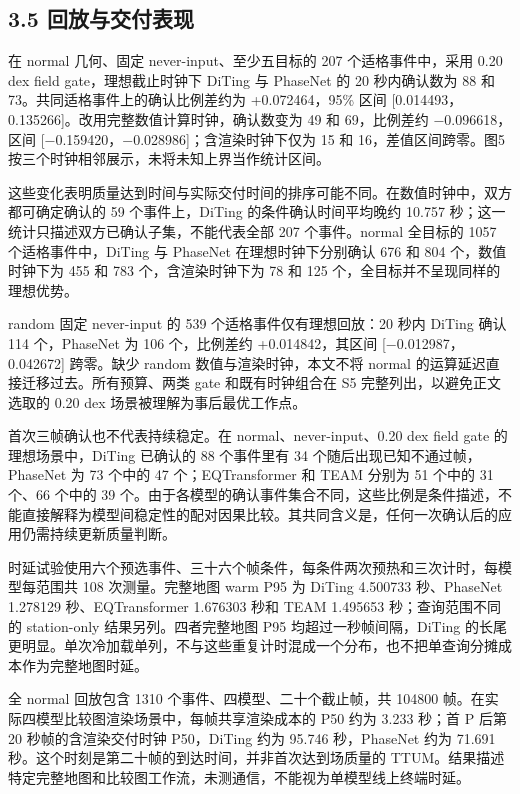 \documentclass[UTF8,a4paper,11pt]{ctexart}
\begin{document}
\subsection*{3.5 回放与交付表现}

在 normal 几何、固定 never-input、至少五目标的 207 个适格事件中，采用 0.20 dex field gate，理想截止时钟下 DiTing 与 PhaseNet 的 20 秒内确认数为 88 和 73。共同适格事件上的确认比例差约为 +0.072464，95\% 区间 [0.014493，0.135266]。改用完整数值计算时钟，确认数变为 49 和 69，比例差约 −0.096618，区间 [−0.159420，−0.028986]；含渲染时钟下仅为 15 和 16，差值区间跨零。图5按三个时钟相邻展示，未将未知上界当作统计区间。

这些变化表明质量达到时间与实际交付时间的排序可能不同。在数值时钟中，双方都可确定确认的 59 个事件上，DiTing 的条件确认时间平均晚约 10.757 秒；这一统计只描述双方已确认子集，不能代表全部 207 个事件。normal 全目标的 1057 个适格事件中，DiTing 与 PhaseNet 在理想时钟下分别确认 676 和 804 个，数值时钟下为 455 和 783 个，含渲染时钟下为 78 和 125 个，全目标并不呈现同样的理想优势。

random 固定 never-input 的 539 个适格事件仅有理想回放：20 秒内 DiTing 确认 114 个，PhaseNet 为 106 个，比例差约 +0.014842，其区间 [−0.012987，0.042672] 跨零。缺少 random 数值与渲染时钟，本文不将 normal 的运算延迟直接迁移过去。所有预算、两类 gate 和既有时钟组合在 S5 完整列出，以避免正文选取的 0.20 dex 场景被理解为事后最优工作点。

首次三帧确认也不代表持续稳定。在 normal、never-input、0.20 dex field gate 的理想场景中，DiTing 已确认的 88 个事件里有 34 个随后出现已知不通过帧，PhaseNet 为 73 个中的 47 个；EQTransformer 和 TEAM 分别为 51 个中的 31 个、66 个中的 39 个。由于各模型的确认事件集合不同，这些比例是条件描述，不能直接解释为模型间稳定性的配对因果比较。其共同含义是，任何一次确认后的应用仍需持续更新质量判断。

时延试验使用六个预选事件、三十六个帧条件，每条件两次预热和三次计时，每模型每范围共 108 次测量。完整地图 warm P95 为 DiTing 4.500733 秒、PhaseNet 1.278129 秒、EQTransformer 1.676303 秒和 TEAM 1.495653 秒；查询范围不同的 station-only 结果另列。四者完整地图 P95 均超过一秒帧间隔，DiTing 的长尾更明显。单次冷加载单列，不与这些重复计时混成一个分布，也不把单查询分摊成本作为完整地图时延。

全 normal 回放包含 1310 个事件、四模型、二十个截止帧，共 104800 帧。在实际四模型比较图渲染场景中，每帧共享渲染成本的 P50 约为 3.233 秒；首 P 后第 20 秒帧的含渲染交付时钟 P50，DiTing 约为 95.746 秒，PhaseNet 约为 71.691 秒。这个时刻是第二十帧的到达时间，并非首次达到场质量的 TTUM。结果描述特定完整地图和比较图工作流，未测通信，不能视为单模型线上终端时延。
\end{document}
